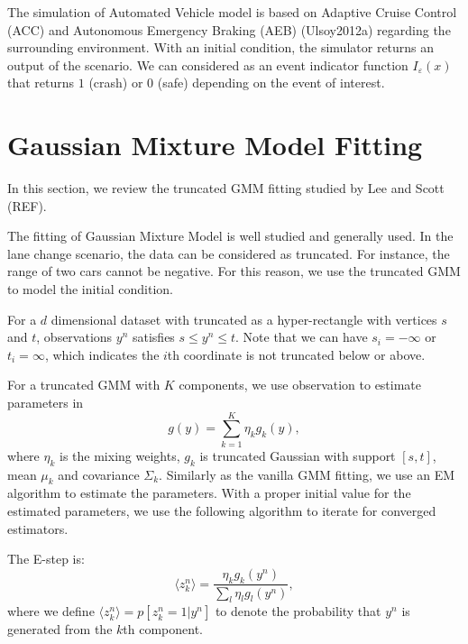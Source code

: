 \documentclass[conference]{IEEEtran}
\begin{document}
The simulation of Automated Vehicle model is based on Adaptive Cruise Control (ACC) and Autonomous Emergency Braking (AEB) (Ulsoy2012a) regarding the surrounding environment. With an initial condition, the simulator returns an output of the scenario. We can considered as an event indicator function $I_\varepsilon(x)$ that returns $1$ (crash) or $0$ (safe) depending on the event of interest.



\section{Gaussian Mixture Model Fitting}\label{sec:gmm}

In this section, we review the truncated GMM fitting studied by Lee and Scott (REF). 

The fitting of Gaussian Mixture Model is well studied and generally used. In the lane change scenario, the data can be considered as truncated. For instance, the range of two cars cannot be negative. For this reason, we use the truncated GMM to model the initial condition. 


For a $d$ dimensional dataset with truncated as a hyper-rectangle with vertices $s$ and $t$, observations $y^n$ satisfies $s\leq y^n \leq t$. Note that we can have $s_i=-\infty$ or $t_i=\infty$, which indicates the $i$th coordinate is not truncated below or above.

For a truncated GMM with $K$ components, we use observation to estimate parameters in \begin{equation}
g(y)=\sum_{k=1}^{K} \eta_k g_k(y),
\end{equation}
where $\eta_k$ is the mixing weights, $g_k$ is truncated Gaussian with support $[s,t]$, mean $\mu_k$ and covariance $\Sigma_k$. Similarly as the vanilla GMM fitting, we use an EM algorithm to estimate the parameters. With a proper initial value for the estimated parameters, we use the following algorithm to iterate for converged estimators.

The E-step is:
\begin{equation}
\langle z_k^n \rangle =\frac{\eta_k g_k(y^n)}{\sum_{l} \eta_l g_l(y^n)},
\end{equation}
where we define $\langle z_k^n \rangle = p[z_k^n=1|y^n]$ to denote the probability that $y^n$ is generated from the $k$th component.
\end{document}
